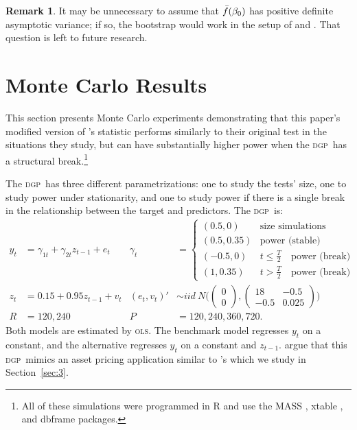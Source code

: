 \documentclass[11pt,fleqn]{article}
\newcommand\citepos[2][]{\citeauthor{#2}'s \citeyearpar[#1]{#2}}
\theoremstyle{definition}
\newtheorem{rem}{Remark}
\newcommand{\btrue}[1][]{\if#1*\hat\beta_{T+1}\else\beta_0\fi}
\newcommand{\dgp}{\textsc{dgp}}
\newcommand{\ols}{\textsc{ols}}
\begin{document}
\begin{rem}
  It may be unnecessary to assume that $\bar{f}(\btrue)$ has positive
  definite asymptotic variance; if so, the bootstrap would work in the
  setup of \citet{ClM:05,ClM:01} and \citet{Mcc:07}.  That question is
  left to future research.
\end{rem}

\section{Monte Carlo Results}\label{sec:2}
This section presents Monte Carlo experiments demonstrating that
this paper's modified version of \citepos{ClW:07} statistic performs
similarly to their original test in the situations they study, but can
have substantially higher power when the \dgp\ has a structural
break.\footnote{All of these simulations were programmed in R
  \citep[version 2.14.0]{R} and use the \textsc{MASS}
  \citep[7.3-22]{VeR:02}, xtable \citep[version 1.6-0]{Dah:09}, and
  dbframe \citep[version 0.2.7]{Cal:10b} packages.}

The \dgp\ has three different parametrizations: one to study the
tests' size, one to study power under stationarity, and one to study
power if there is a single break in the relationship between the
target and predictors.  The \dgp\ is:
\begin{align*}
  y_t &= \gamma_{1t} + \gamma_{2t} z_{t-1} + e_t &
  \gamma_t &=
  \begin{cases}
    (0.5, 0)    & \text{size simulations} \\
    (0.5, 0.35) & \text{power (stable)} \\
    (-0.5, 0)    & t \leq \tfrac{T}{2} \quad \text{power (break)} \\
    (1, 0.35) & t > \tfrac{T}{2} \quad \text{power (break)}
  \end{cases}\\\nonumber
  z_t &= 0.15 + 0.95 z_{t-1} + v_t &
  (e_t, v_t)' &\sim iid\ N\Bigg(\begin{pmatrix} 0 \\ 0
  \end{pmatrix}
   , \begin{pmatrix} 18 & -
    0.5 \\ -0.5 & 0.025 \end{pmatrix}\Bigg)
  \\ R &= 120, 240 & P &= 120, 240, 360, 720.
\end{align*}
Both models are estimated by \ols. The benchmark model regresses $y_t$
on a constant, and the alternative regresses $y_t$ on a constant and
$z_{t-1}$.  \citet{ClW:07} argue that this \dgp\ mimics an asset
pricing application similar to \citepos{GoW:08} which we study in
Section~\ref{sec:3}.
\end{document}
